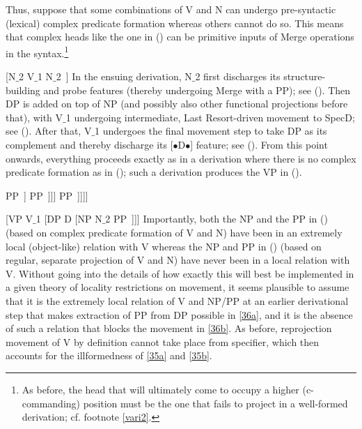 \documentclass[output=paper
,modfonts
,nonflat]{langsci/langscibook}
\begin{document}
Thus, suppose that some combinations of V and N can undergo
pre-syntactic (lexical) complex predicate formation whereas others
cannot do so. This means that complex heads like the one in (\Next) can
be primitive inputs of Merge operations in the syntax.\footnote{As
  before, the head that will ultimately come to occupy a higher
  (c-commanding) position must be the one that fails to project in a
  well-formed derivation; cf. footnote \ref{vari2}.}

\ea\relax\label{ex:mueller:39} [N$\_$2 V$\_$1 N$\_$2~] \z
In the ensuing derivation, N$\_$2 first discharges its structure-building
and probe features (thereby undergoing Merge with a PP); see (\Next[a]).
Then
DP is added on top of NP (and possibly also other functional projections
before that), with V$\_$1 undergoing intermediate, Last Resort-driven
movement to SpecD; see (\Next[a]). After that, V$\_$1 undergoes the
final  movement step to take DP as its complement and thereby
discharge its [{\small $\bullet$}D{\small $\bullet$}] feature; see
(\Next[b]). From this point onwards, everything proceeds exactly as in
a derivation where there is no complex predicate formation as in
(\Next); such a derivation produces the VP in (\NNext). 

\ea\label{ex:mueller:40}
\ea\relax [NP [N$\_$2 V$\_$1 N$\_$2~] PP~]
\ex\relax [DP V$\_$1 [D$'$ D [NP [N$\_$2 t$\_$1 N$\_$2~] PP~]]]
\ex\relax [VP V$\_$1 [DP t$'$\_$1$ [D$'$ D [NP [N$\_$2 t$\_$1 N$\_$2~] PP~]]]]
\z
\z

\ea\label{ex:mueller:41} [VP V$\_$1 [DP D [NP N$\_$2 PP~]]]\z
Importantly, both the NP and the PP in (\LLast[c]) (based on complex
predicate formation of V and N) have been in an extremely local
(object-like) relation with V whereas the NP and PP in (\Last) (based
on regular, separate projection of V and N) have never been in a local
relation with V. Without going into the details of how exactly this
will best be implemented in a given theory of locality restrictions on movement, it
seems plausible to assume that it is the extremely local relation of V
and NP/PP at an earlier derivational step that makes extraction of PP
from DP possible in  \ref{36a}, and it is the absence of such a relation that blocks
the movement in \ref{36b}. As before, reprojection movement of V
by definition cannot take place from specifier, which then accounts
for the illformedness of \ref{35a} and \ref{35b}.
\end{document}
